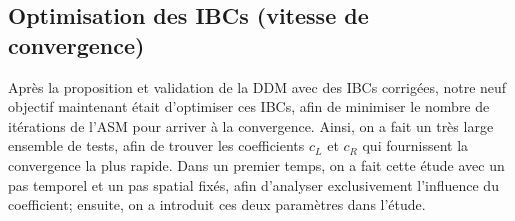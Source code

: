 %
%
%
%
%
%

\subsection{Optimisation des IBCs (vitesse de convergence)}

\indent Après la proposition et validation de la DDM avec des IBCs corrigées, notre neuf objectif maintenant était d'optimiser ces IBCs, afin de minimiser le nombre de itérations de l'ASM pour arriver à la convergence. Ainsi, on a fait un très large ensemble de tests, afin de trouver les coefficients $c_L$ et $c_R$ qui fournissent la convergence la plus rapide. Dans un premier temps, on a fait cette étude avec un pas temporel et un pas spatial fixés, afin d'analyser exclusivement l'influence du coefficient; ensuite, on a introduit ces deux paramètres dans l'étude.

